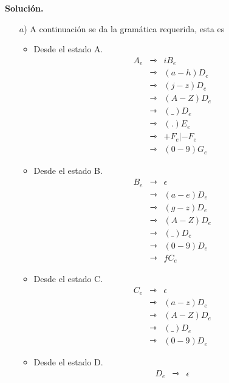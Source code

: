 \textbf{Solución.} 
\begin{itemize}
\item[$a$)] A continuación se da la gramática requerida, esta es
  \begin{multicols}{2}
    \begin{itemize}
    \item Desde el estado A.
      \begin{eqnarray*}
        A_e &\rightarrowtriangle& iB_e\\
        &\rightarrowtriangle& (a-h)D_e\\
        &\rightarrowtriangle& (j-z)D_e\\
        &\rightarrowtriangle& (A-Z)D_e\\
        &\rightarrowtriangle& (\_)D_e\\
        &\rightarrowtriangle& (.)E_e\\
        &\rightarrowtriangle& +F_e | -F_e\\
        &\rightarrowtriangle& (0-9)G_e
      \end{eqnarray*}
    \item Desde el estado B.
      \begin{eqnarray*}
        B_e &\rightarrowtriangle& \epsilon\\
        &\rightarrowtriangle& (a-e)D_e\\
        &\rightarrowtriangle& (g-z)D_e\\
        &\rightarrowtriangle& (A-Z)D_e\\
        &\rightarrowtriangle& (\_)D_e\\
        &\rightarrowtriangle& (0-9)D_e\\
        &\rightarrowtriangle& fC_e
      \end{eqnarray*}
    \item Desde el estado C.
      \begin{eqnarray*}
        C_e &\rightarrowtriangle& \epsilon\\
        &\rightarrowtriangle& (a-z)D_e\\
        &\rightarrowtriangle& (A-Z)D_e\\
        &\rightarrowtriangle& (\_)D_e\\
        &\rightarrowtriangle& (0-9)D_e
      \end{eqnarray*}
    \item Desde el estado D.
      \begin{eqnarray*}
        D_e &\rightarrowtriangle& \epsilon\\

\end{eqnarray*}
\end{itemize}
\end{multicols}
\end{itemize}
